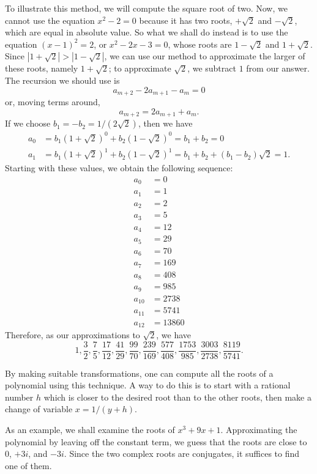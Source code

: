 \documentclass[12pt]{article}
\begin{document}
To illustrate this method, we will compute the square root of two.  Now,
we cannot use the equation $x^2 - 2 = 0$ because it has two roots,
$+\sqrt{2}$ and $-\sqrt{2}$, which are equal in absolute value.  So what
we shall do instead is to use the equation $(x - 1)^2 = 2$, or $x^2 - 2 x
- 3 = 0$, whose roots are $1 - \sqrt{2}$ and $1 + \sqrt{2}$.  Since
$|1 + \sqrt{2}| > |1 - \sqrt{2}|$, we can use our method to approximate
the larger of these roots, namely $1 + \sqrt{2}$; to approximate $\sqrt{2}$,
we subtract $1$ from our answer.  The recursion we should use is
\[
 a_{m+2} - 2 a_{m+1} - a_m = 0
\]
or, moving terms around,
\[
 a_{m+2} = 2 a_{m+1} + a_m.
\]
If we choose $b_1 = - b_2 = 1/(2 \sqrt{2})$, then we have
\begin{align*}
 a_0 &= b_1 \left( 1 + \sqrt{2} \right )^0 +
       b_2 \left( 1 - \sqrt{2} \right )^0 = b_1 + b_2 = 0 \\
 a_1 &= b_1 \left( 1 + \sqrt{2} \right )^1 +
        b_2 \left( 1 - \sqrt{2} \right )^1 =
        b_1 + b_2 + (b_1 - b_2) \sqrt{2} = 1.
\end{align*}
Starting with these values, we obtain the following sequence:
\begin{align*}
 a_0 &= 0 \\
 a_1 &= 1 \\
 a_2 &= 2 \\
 a_3 &= 5 \\
 a_4 &= 12 \\
 a_5 &= 29 \\
 a_6 &= 70 \\
 a_7 &= 169 \\
 a_8 &= 408 \\
 a_9 &= 985 \\
 a_{10} &= 2738 \\
 a_{11} &= 5741 \\
 a_{12} &= 13860
\end{align*}
Therefore, as our approximations to $\sqrt{2}$, we have
\[
 1, \frac{3}{2}, \frac{7}{5}, \frac{17}{12}, \frac{41}{29}, 
 \frac{99}{70}, \frac{239}{169}, \frac{577}{408},
 \frac{1753}{985}, \frac{3003}{2738}, \frac{8119}{5741}.
\]

By making suitable transformations, one can compute all the roots
of a polynomial using this technique.  A way to do this is to start
with a rational number $h$ which is closer to the desired root than 
to the other roots, then make a change of variable $x = 1 / (y + h)$.

As an example, we shall examine the roots of $x^3 + 9 x + 1$.  
Approximating the polynomial by leaving off the constant term, we
guess that the roots are close to $0$, $+3i$, and $-3i$.  Since the
two complex roots are conjugates, it suffices to find one of them.
\end{document}
